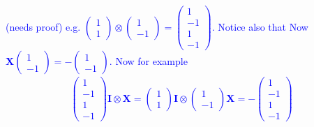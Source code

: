 \documentclass{article}
\begin{document}
\textcolor{blue}{
	(needs proof) e.g. $\begin{pmatrix} 1 \\ 1 \end{pmatrix} \otimes \begin{pmatrix} 1 \\ -1 \end{pmatrix} = \begin{pmatrix} 1 \\ -1 \\ 1 \\ -1 \end{pmatrix}$. Notice also that  Now $\mathbf{X}\begin{pmatrix} 1 \\ -1 \end{pmatrix} = - \begin{pmatrix} 1 \\ -1 \end{pmatrix}$. Now for example
	\begin{align*}
		 \begin{pmatrix} 1 \\ -1 \\ 1 \\ -1 \end{pmatrix} \mathbf{I} \otimes \mathbf{X} = \begin{pmatrix} 1 \\ 1 \end{pmatrix} \mathbf{I} \otimes \begin{pmatrix} 1 \\ -1 \end{pmatrix} \mathbf{X} = - \begin{pmatrix} 1 \\ -1 \\ 1 \\ -1 \end{pmatrix}
	\end{align*}
}
\\
\end{document}
